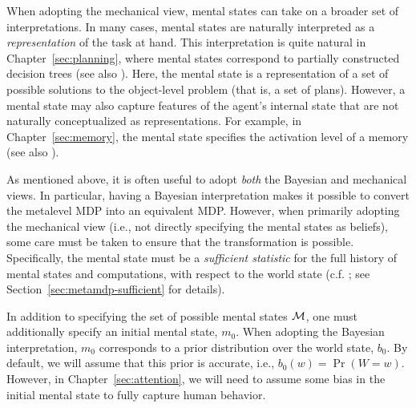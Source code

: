 When adopting the mechanical view, mental states can take on a broader set of interpretations. In many cases, mental states are naturally interpreted as a \emph{representation} of the task at hand. This interpretation is quite natural in Chapter~\ref{sec:planning}, where mental states correspond to partially constructed decision trees (see also \citealp[Chapter 5]{hay2016principles}). Here, the mental state is a representation of a set of possible solutions to the object-level problem (that is, a set of plans). However, a mental state may also capture features of the agent's internal state that are not naturally conceptualized as representations. For example, in Chapter~\ref{sec:memory}, the mental state specifies the activation level of a memory (see also \citealp{suchow2016deciding}).

As mentioned above, it is often useful to adopt \emph{both} the Bayesian and mechanical views. In particular, having a Bayesian interpretation makes it possible to convert the metalevel MDP into an equivalent MDP. However, when primarily adopting the mechanical view (i.e., not directly specifying the mental states as beliefs), some care must be taken to ensure that the transformation is possible. Specifically, the mental state must be a \emph{sufficient statistic} for the full history of mental states and computations, with respect to the world state (c.f. \citealp{kaelbling1998planning}; see Section~\ref{sec:metamdp-sufficient} for details).

In addition to specifying the set of possible mental states $\mathcal{M}$, one must additionally specify an initial mental state, $m_0$. When adopting the Bayesian interpretation, $m_0$ corresponds to a prior distribution over the world state, $b_0$. By default, we will assume that this prior is accurate, i.e., $b_0(w) = \Pr(W=w)$. However, in Chapter~\ref{sec:attention}, we will need to assume some bias in the initial mental state to fully capture human behavior.



